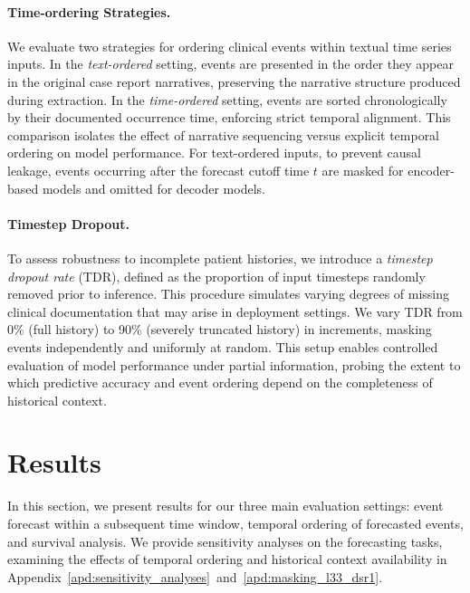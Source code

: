 \documentclass[letterpaper]{article} %
\begin{document}
\paragraph{Time-ordering Strategies.} We evaluate two strategies for ordering clinical events within textual time series inputs. In the \emph{text-ordered} setting, events are presented in the order they appear in the original case report narratives, preserving the narrative structure produced during extraction. In the \emph{time-ordered} setting, events are sorted chronologically by their documented occurrence time, enforcing strict temporal alignment. This comparison isolates the effect of narrative sequencing versus explicit temporal ordering on model performance. For text-ordered inputs, to prevent causal leakage, events occurring after the forecast cutoff time $t$ are masked for encoder-based models and omitted for decoder models.

\paragraph{Timestep Dropout.} To assess robustness to incomplete patient histories, we introduce a \emph{timestep dropout rate} (TDR), defined as the proportion of input timesteps randomly removed prior to inference. This procedure simulates varying degrees of missing clinical documentation that may arise in deployment settings. We vary TDR from 0\% (full history) to 90\% (severely truncated history) in increments, masking events independently and uniformly at random. This setup enables controlled evaluation of model performance under partial information, probing the extent to which predictive accuracy and event ordering depend on the completeness of historical context.




% 
\section{Results}

In this section, we present results for our three main evaluation settings: event forecast within a subsequent time window, temporal ordering of forecasted events, and survival analysis. We provide sensitivity analyses on the forecasting tasks, examining the effects of temporal ordering and historical context availability in Appendix~\ref{apd:sensitivity_analyses}~and~\ref{apd:masking_l33_dsr1}.
\end{document}
